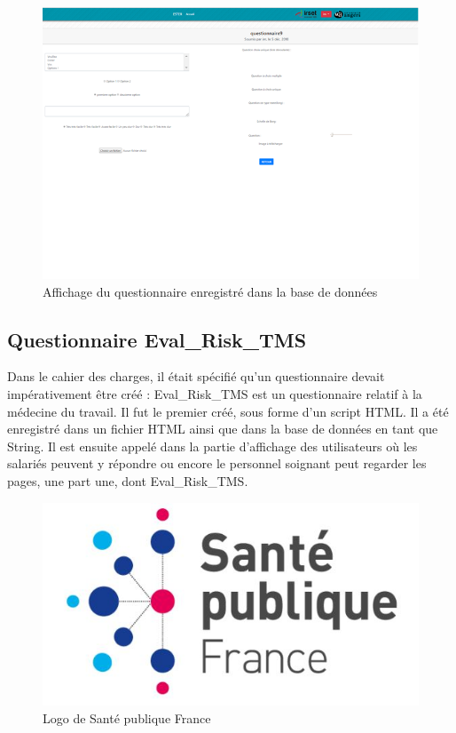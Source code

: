 \begin{figure}[H]
    \begin{center}
	\includegraphics[scale=0.7]{img/questionnaire/affichage}
    \end{center}
    \caption{Affichage du questionnaire enregistré dans la base de données}
\end{figure}

\subsection{Questionnaire Eval\_Risk\_TMS}

Dans le cahier des charges, il était spécifié qu'un questionnaire devait impérativement être créé : Eval\_Risk\_TMS est un questionnaire relatif à la médecine du travail. Il fut le premier créé, sous forme d'un script HTML. Il a été enregistré dans un fichier HTML ainsi que dans la base de données en tant que String.
Il est ensuite appelé dans la partie d'affichage des utilisateurs où les salariés peuvent y répondre ou encore le personnel soignant peut regarder les pages, une part une, dont Eval\_Risk\_TMS.

\begin{figure}[H]
    \begin{center}
	\includegraphics[scale=0.4]{img/Sante}
    \end{center}
    \caption{Logo de Santé publique France}
\end{figure}